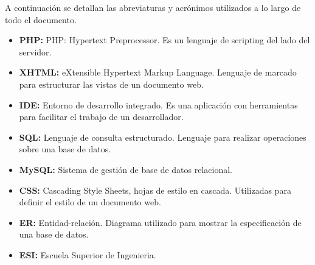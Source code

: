 A continuación se detallan las abreviaturas y acrónimos utilizados a lo largo de todo el documento.

\begin{itemize}
\item {\bf PHP:} PHP: Hypertext Preprocessor. Es un lenguaje de scripting del lado del servidor.
\item {\bf XHTML:} eXtensible Hypertext Markup Language. Lenguaje de marcado para estructurar las vistas de un documento web.
\item {\bf IDE:} Entorno de desarrollo integrado. Es una aplicación con herramientas para facilitar el trabajo de un desarrollador.
\item {\bf SQL:} Lenguaje de consulta estructurado. Lenguaje para realizar operaciones sobre una base de datos.
\item {\bf MySQL:} Sistema de gestión de base de datos relacional.
\item {\bf CSS:} Cascading Style Sheets, hojas de estilo en cascada. Utilizadas para definir el estilo de un documento web.
\item {\bf ER:} Entidad-relación. Diagrama utilizado para mostrar la especificación de una base de datos.
\item {\bf ESI:} Escuela Superior de Ingenieria.
\end{itemize}
